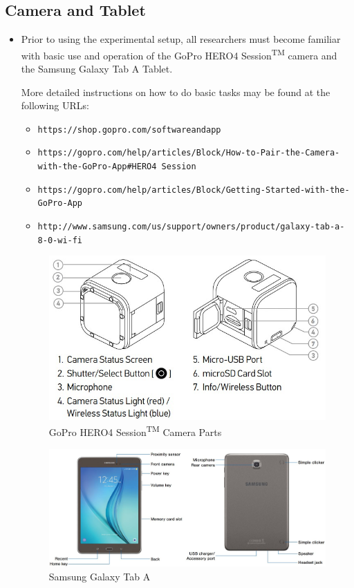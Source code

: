 \documentclass[letterpaper,11pt]{article}
\begin{document}
    \subsection{Camera and Tablet} \label{sec:cam_tab}
    \begin{itemize}
    \item Prior to using the experimental setup, all researchers must become 
        familiar with basic use and operation of the 
        GoPro\textsuperscript{\textcopyright} HERO4
        Session\textsuperscript{TM} camera and the Samsung Galaxy Tab A Tablet. 
        
        More detailed instructions on how to do basic tasks may be found at the 
        following URLs:
        \begin{itemize}
        \item \texttt{https://shop.gopro.com/softwareandapp}
        \item \texttt{https://gopro.com/help/articles/Block/How-to-Pair-the-Camera-with-the-GoPro-App\#HERO4 Session}
        \item \texttt{https://gopro.com/help/articles/Block/Getting-Started-with-the-GoPro-App}
        \item \texttt{http://www.samsung.com/us/support/owners/product/galaxy-tab-a-8-0-wi-fi}
        \end{itemize}
    
    
\begin{figure}[H]
\centering
\includegraphics[width=.6\textwidth]{Camera_diagram.jpg}
\caption{GoPro\textsuperscript{\textcopyright} HERO4
        Session\textsuperscript{TM} Camera Parts}
\label{fig:cam_diag}
\end{figure}

\begin{figure}[H]
\centering
\includegraphics[width=1\textwidth]{tablet.jpg}
\caption{Samsung Galaxy Tab A}
\label{fig:tablet}
\end{figure}
    

\end{itemize}
\end{document}
